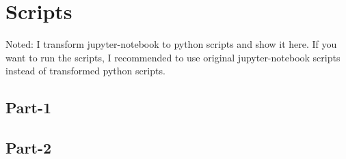 
\section{Scripts}
Noted: I transform jupyter-notebook to python scripts and show it here. 
If you want to run the scripts, I recommended to use original jupyter-notebook scripts instead of transformed python scripts. 

\subsection{Part-1}

    

\subsection{Part-2}
\clearpage